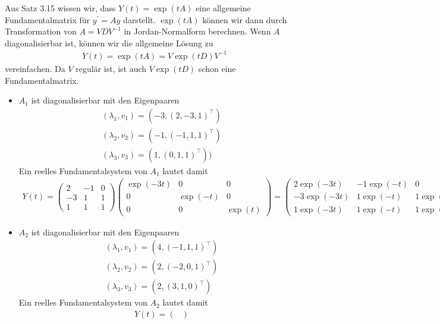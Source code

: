 \begin{solution}
Aus Satz 3.15 wissen wir, dass $Y(t) = \exp(tA)$ eine allgemeine Fundamentalmatrix für $y^{\prime} = Ay$
darstellt. $\exp(tA)$ können wir dann durch Transformation von $A = VDV^{-1}$ in Jordan-Normalform berechnen.
Wenn $A$ diagonalisierbar ist, können wir die allgemeine Lösung zu
\begin{align*}
  Y(t) = \exp(tA) = V\exp(tD)V^{-1}
\end{align*}
vereinfachen. Da $V$ regulär ist, ist auch $V\exp(tD)$ schon eine Fundamentalmatrix.
\begin{itemize}
  \item $A_1$ ist diagonalisierbar mit den Eigenpaaren
  \begin{align*}
  (\lambda_1,v_1) = (-3,(2,-3,1)^{\top})\\
  (\lambda_2,v_2) = (-1,(-1,1,1)^{\top}) \\
  (\lambda_3,v_3) = (1,(0,1,1)^{\top}))
  \end{align*}
  Ein reelles Fundamentalsystem von $A_1$ lautet damit
  \begin{align*}
    Y(t) = \begin{pmatrix}
      2 & -1 & 0 \\ -3 & 1 & 1 \\ 1 & 1 & 1
    \end{pmatrix}
    \begin{pmatrix}
      \exp(-3t) & 0 & 0 \\
      0 & \exp(-t) & 0 \\
      0 & 0 & \exp(t)
    \end{pmatrix} =
    \begin{pmatrix}
      2\exp(-3t) & -1\exp(-t) & 0 \\
      -3\exp(-3t) & 1\exp(-t) & 1\exp(t) \\
      1\exp(-3t) & 1\exp(-t) & 1\exp(t)
    \end{pmatrix}.
  \end{align*}
  \item $A_2$ ist diagonalisierbar mit den Eigenpaaren
  \begin{align*}
  (\lambda_1,v_1) = (4,(-1,1,1)^{\top}) \\
  (\lambda_2,v_2) = (2,(-2,0,1)^{\top}) \\
  (\lambda_3,v_3) = (2,(3,1,0)^{\top})
  \end{align*}
  Ein reelles Fundamentalsystem von $A_2$ lautet damit
  \begin{align*}
    Y(t) = \begin{pmatrix}

\end{pmatrix}
\end{align*}
\end{itemize}
\end{solution}
